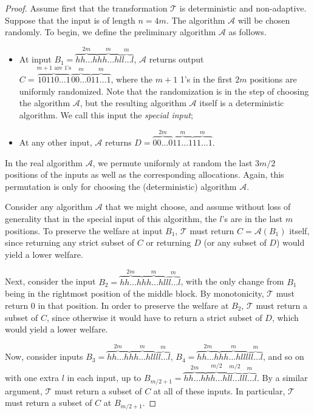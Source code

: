 \documentclass[runningheads,a4paper]{llncs}
\begin{document}
\begin{proof}

Assume first that the transformation $\mathcal{T}$ is deterministic and non-adaptive. Suppose that the input is of length $n=4m$. The algorithm $\mathcal{A}$ will be chosen randomly. To begin, we define the preliminary algorithm $\mathcal{A}$ as follows.
\begin{itemize}
\item At input $B_1=\overbrace{hh\dots h}^{2m}\overbrace{hh\dots h}^m\overbrace{ll\dots l}^m$, $\mathcal{A}$ returns output\\$C=\overbrace{10110\dots 1}^{m+1 \text{ are 1's}}\overbrace{00\dots 0}^m\overbrace{11\dots 1}^m$, where the $m+1$ 1's in the first $2m$ positions are uniformly randomized. Note that the randomization is in the step of choosing the algorithm $\mathcal{A}$, but the resulting algorithm $\mathcal{A}$ itself is a deterministic algorithm. We call this input the \textit{special input};

\item At any other input, $\mathcal{A}$ returns $D=\overbrace{00\dots 0}^{2m}\overbrace{11\dots 1}^m\overbrace{11\dots 1}^m$.
\end{itemize}
In the real algorithm $\mathcal{A}$, we permute uniformly at random the last $3m/2$ positions of the inputs as well as the corresponding allocations. Again, this permutation is only for choosing the (deterministic) algorithm $\mathcal{A}$.

Consider any algorithm $\mathcal{A}$ that we might choose, and assume without loss of generality that in the special input of this algorithm, the $l$'s are in the last $m$ positions. To preserve the welfare at input $B_1$, $\mathcal{T}$ must return $C=\mathcal{A}(B_1)$ itself, since returning any strict subset of $C$ or returning $D$ (or any subset of $D$) would yield a lower welfare.

Next, consider the input $B_2=\overbrace{hh\dots h}^{2m}\overbrace{hh\dots hl}^m\overbrace{ll\dots l}^m$, with the only change from $B_1$ being in the rightmost position of the middle block. By monotonicity, $\mathcal{T}$ must return 0 in that position. In order to preserve the welfare at $B_2$, $\mathcal{T}$ must return a subset of $C$, since otherwise it would have to return a strict subset of $D$, which would yield a lower welfare.

Now, consider inputs $B_3=\overbrace{hh\dots h}^{2m}\overbrace{hh\dots hll}^m\overbrace{ll\dots l}^m$, $B_4=\overbrace{hh\dots h}^{2m}\overbrace{hh\dots hlll}^m\overbrace{ll\dots l}^m$, and so on with one extra $l$ in each input, up to $B_{m/2+1}=\overbrace{hh\dots h}^{2m}\overbrace{hh\dots h}^{m/2}\overbrace{ll\dots l}^{m/2}\overbrace{ll\dots l}^m$. By a similar argument, $\mathcal{T}$ must return a subset of $C$ at all of these inputs. In particular, $\mathcal{T}$ must return a subset of $C$ at $B_{m/2+1}$. 


\end{proof}
\end{document}
